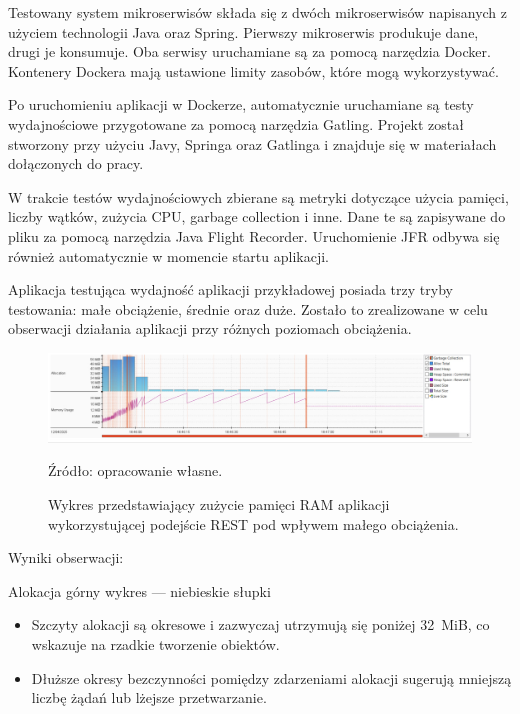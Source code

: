 \documentclass[runningheads,12pt]{llncs}
\begin{document}
Testowany system mikroserwisów składa się z dwóch mikroserwisów napisanych z użyciem technologii Java oraz Spring. Pierwszy mikroserwis produkuje dane, drugi je konsumuje. Oba serwisy uruchamiane są za pomocą narzędzia Docker. Kontenery Dockera mają ustawione limity zasobów, które mogą wykorzystywać.

Po uruchomieniu aplikacji w Dockerze, automatycznie uruchamiane są testy wydajnościowe przygotowane za pomocą narzędzia Gatling. Projekt został stworzony przy użyciu Javy, Springa oraz Gatlinga i znajduje się w materiałach dołączonych do pracy.

W trakcie testów wydajnościowych zbierane są metryki dotyczące użycia pamięci, liczby wątków, zużycia CPU, garbage collection i inne. Dane te są zapisywane do pliku za pomocą narzędzia Java Flight Recorder. Uruchomienie JFR odbywa się również automatycznie w momencie startu aplikacji.

Aplikacja testująca wydajność aplikacji przykładowej posiada trzy tryby testowania: małe obciążenie, średnie oraz duże. Zostało to zrealizowane w celu obserwacji działania aplikacji przy różnych poziomach obciążenia.

\newpage


\begin{figure}
    \includegraphics[width=\linewidth]{images/rest-memory-low-graph.jpg}
    \caption{Wykres przedstawiający zużycie pamięci RAM aplikacji wykorzystującej podejście REST pod wpływem małego obciążenia.} \label{fig1}
    \vspace{0.5em}
    {\small Źródło: opracowanie własne.}
\end{figure}

Wyniki obserwacji:

Alokacja górny wykres — niebieskie słupki

\begin{itemize}
  \item Szczyty alokacji są okresowe i zazwyczaj utrzymują się poniżej 32~MiB, co wskazuje na rzadkie tworzenie obiektów.
  \item Dłuższe okresy bezczynności pomiędzy zdarzeniami alokacji sugerują mniejszą liczbę żądań lub lżejsze przetwarzanie.
\end{itemize}
\end{document}
